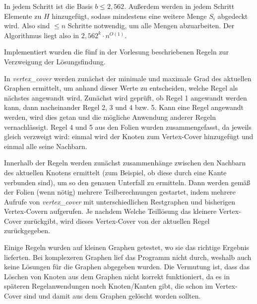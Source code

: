 In jedem Schritt ist die Basis $b \leq 2,562$. Außerdem werden in jedem Schritt Elemente zu $H$ hinzugefügt, sodass mindestens eine weitere Menge $S_i$ abgedeckt wird. Also sind $\leq n$ Schritte notwendig, um alle Mengen abzuarbeiten. Der Algorithmus liegt also in $2,562^k \cdot n^{O(1)}$.


Implementiert wurden die  fünf in der Vorlesung beschriebenen Regeln zur Verzweigung der Lösungsfindung.

In \textit{vertex\_cover} werden zunächst der minimale und maximale Grad des aktuellen Graphen ermittelt, um anhand dieser Werte zu entscheiden, welche Regel als nächstes angewandt wird. Zunächst wird geprüft, ob Regel 1 angewandt werden kann, dann nacheinander Regel 2, 3 und 4 bzw. 5. Kann eine Regel angewandt werden, wird dies getan und die mögliche Anwendung anderer Regeln vernachlässigt. Regel 4 und 5 aus den Folien wurden zusammengefasst, da jeweils gleich verzweigt wird: einmal wird der Knoten zum Vertex-Cover hinzugefügt und einmal alle seine Nachbarn. 

Innerhalb der Regeln werden zunächst zusammenhänge zwischen den Nachbarn des aktuellen Knotens ermittelt (zum Beispiel, ob diese durch eine Kante verbunden sind), um so den genauen Unterfall zu ermitteln. Dann werden gemäß der Folien (wenn nötig) mehrere Teilberechnungen gestartet, indem mehrere Aufrufe von \textit{vertex\_cover} mit unterschiedlichen Restgraphen und bisherigen Vertex-Covern aufgerufen. Je nachdem Welche Teillösung das kleinere Vertex-Cover zurückgibt, wird dieses Vertex-Cover von der aktuellen Regel zurückgegeben.

Einige Regeln wurden auf kleinen Graphen getestet, wo sie das richtige Ergebnis lieferten. Bei komplexeren Graphen lief das Programm nicht durch, weshalb auch keine Lösungen für die Graphen abgegeben wurden. Die Vermutung ist, dass das Löschen von Knoten aus dem Graphen nicht korrekt funktioniert, da es in späteren Regelanwendungen noch Knoten/Kanten gibt, die schon im Vertex-Cover sind und damit aus dem Graphen gelöscht worden sollten.



